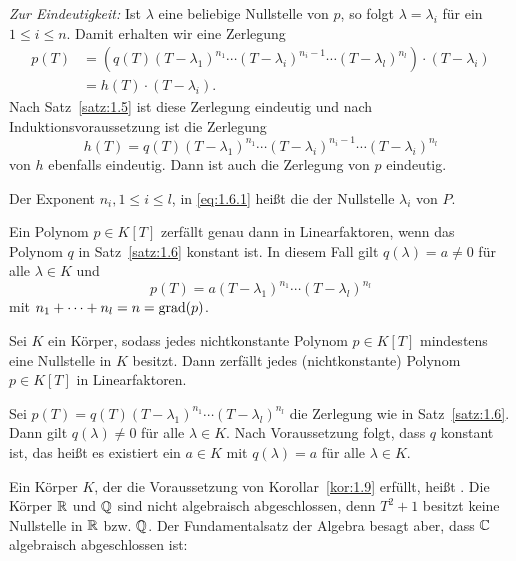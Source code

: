 \begin{beweis}
\begin{description}
		\textit{Zur Eindeutigkeit:}
		Ist $\lambda$ eine beliebige Nullstelle von $p$, so folgt $\lambda = \lambda_i$ für ein $1 \leq i \leq n$.
		Damit erhalten wir eine Zerlegung
		\begin{align*}
			p(T) &= (q(T) (T-\lambda_1)^{n_1} \cdots (T-\lambda_i)^{n_i-1} \cdots (T-\lambda_l)^{n_l})\cdot (T-\lambda_i) \\
			&= h(T) \cdot (T-\lambda_i).
		\end{align*}
		Nach Satz~\ref{satz:1.5} ist diese Zerlegung eindeutig und nach Induktionsvoraussetzung ist die Zerlegung
		\[
			h(T) = q(T) (T-\lambda_1)^{n_1} \cdots (T-\lambda_i)^{n_i-1} \cdots (T-\lambda_i)^{n_l}
		\]
		von $h$ ebenfalls eindeutig.
		Dann ist auch die Zerlegung von $p$ eindeutig. 
	\end{description}
\end{beweis}

\begin{definition}
	\label{def:1.7}
	Der Exponent $n_i, 1 \leq i \leq l$, in \eqref{eq:1.6.1} heißt die  der Nullstelle $\lambda_i$ von $P$.
\end{definition}

\begin{bemerkung}
	\label{bem:1.8}
	Ein Polynom $p \in K[T]$ zerfällt genau dann in Linearfaktoren, wenn das Polynom $q$ in Satz~\ref{satz:1.6} konstant ist.
	In diesem Fall gilt $q(\lambda) = a \neq 0$ für alle $\lambda \in K$ und
	\[
		p(T) = a(T-\lambda_1)^{n_1} \cdots (T-\lambda_l)^{n_l}
	\]
	mit $n_1+\cdots+n_l = n = \operatorname{grad}(p)$.
\end{bemerkung}

\begin{korollar}
	\label{kor:1.9}
	Sei $K$ ein Körper, sodass jedes nichtkonstante Polynom $p \in K[T]$ mindestens eine Nullstelle in $K$ besitzt.
	Dann zerfällt jedes (nichtkonstante) Polynom $p \in K[T]$ in Linearfaktoren.
\end{korollar}

\begin{beweis}
	Sei $p(T) = q(T)(T-\lambda_1)^{n_1} \cdots (T-\lambda_l)^{n_l}$ die Zerlegung wie in Satz~\ref{satz:1.6}.
	Dann gilt $q(\lambda) \neq 0$ für alle $\lambda \in K$.
	Nach Voraussetzung folgt, dass $q$ konstant ist, das heißt es existiert ein $a \in K$ mit $q(\lambda) = a$ für alle $\lambda \in K$. 
\end{beweis}

\begin{bemerkung}
	\label{bem:1.10}
	Ein Körper $K$, der die Voraussetzung von Korollar~\ref{kor:1.9} erfüllt, heißt .
	Die Körper $\mathbb{R}$ und $\mathbb{Q}$ sind nicht algebraisch abgeschlossen, denn $T^2+1$ besitzt keine Nullstelle in $\mathbb{R}$ bzw. $\mathbb{Q}$.
	Der Fundamentalsatz der Algebra besagt aber, dass $\mathbb{C}$ algebraisch abgeschlossen ist:
\end{bemerkung}

